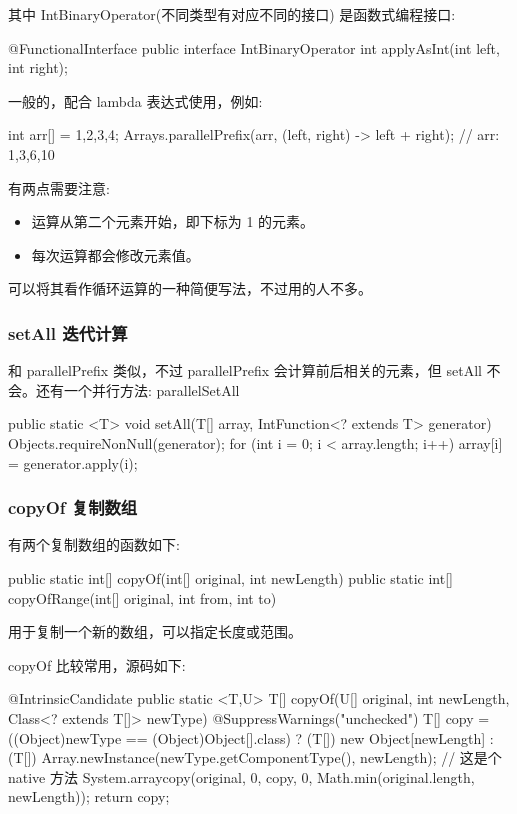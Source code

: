 其中 IntBinaryOperator(不同类型有对应不同的接口) 是函数式编程接口:

\begin{Java}
@FunctionalInterface
public interface IntBinaryOperator {
    int applyAsInt(int left, int right);
}
\end{Java}

一般的，配合 lambda 表达式使用，例如:
\begin{Java}
int arr[] = {1,2,3,4};
Arrays.parallelPrefix(arr, (left, right) -> left + right);
// arr: {1,3,6,10}
\end{Java}

有两点需要注意:
\begin{itemize}
    \item 运算从第二个元素开始，即下标为 1 的元素。
    \item 每次运算都会修改元素值。
\end{itemize}

可以将其看作循环运算的一种简便写法，不过用的人不多。

\subsubsection*{setAll 迭代计算}

和 parallelPrefix 类似，不过 parallelPrefix 会计算前后相关的元素，但 setAll 不会。还有一个并行方法: parallelSetAll

\begin{Java}
public static <T> void setAll(T[] array, IntFunction<? extends T> generator) {
    Objects.requireNonNull(generator);
    for (int i = 0; i < array.length; i++)
        array[i] = generator.apply(i);
}
\end{Java}

\subsubsection*{copyOf 复制数组}

有两个复制数组的函数如下:

\begin{Java}
public static int[] copyOf(int[] original, int newLength)
public static int[] copyOfRange(int[] original, int from, int to)
\end{Java}

用于复制一个新的数组，可以指定长度或范围。

copyOf 比较常用，源码如下:
\begin{Java}
@IntrinsicCandidate
public static <T,U> T[] copyOf(U[] original, int newLength, Class<? extends T[]> newType) {
    @SuppressWarnings("unchecked")
    T[] copy = ((Object)newType == (Object)Object[].class)
        ? (T[]) new Object[newLength]
        : (T[]) Array.newInstance(newType.getComponentType(), newLength);
    // 这是个 native 方法
    System.arraycopy(original, 0, copy, 0, Math.min(original.length, newLength));
    return copy;
}
\end{Java}


